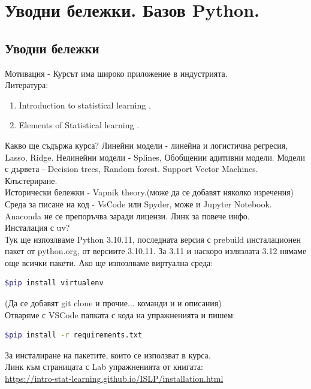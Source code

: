 \section{Уводни бележки. Базов Python.}


\subsection{Уводни бележки}
	Мотивация - Курсът има широко приложение в индустрията.\\	
	Литература:
	\begin{enumerate}
	\item  Introduction to statistical learning \cite{james2023introduction}.
	\item  Elements of Statistical learning  \cite{hastie01statisticallearning}.
	\end{enumerate}
	
	\noindent
	Какво ще съдържа курса? Линейни модели - линейна и логистична регресия, Lasso, Ridge. Нелинейни модели - Splines, Обобщении адитивни модели.
	Модели с дървета - Decision trees, Random forest. Support Vector Machines. Клъстериране.   \\
	
	\noindent
	Исторически бележки - Vapnik theory.(може да се добавят няколко изречения) \\

	\noindent	
	Среда за писане на код - VsCode или Spyder, може и Jupyter Notebook. Anaconda не се препоръчва заради лицензи. Линк за повече инфо. \\
	Инсталация с uv? \\
 	Тук ще изпозлваме Python 3.10.11, последната версия с prebuild инсталационен пакет от python.org,
 	от версиите 3.10.11. За 3.11 и наскоро излязлата 3.12 нямаме още всички пакети. Ако ще изпозлваме виртуална среда: 	
 	\begin{lstlisting}[language=bash]
$pip install virtualenv
 	\end{lstlisting}
 	(Да се добавят git clone и прочие... команди и и описания) \\
 	
 	Отваряме с VSCode папката с кода на упражненията и пишем:
	\begin{lstlisting}[language=bash]
$pip install -r requirements.txt
 	\end{lstlisting}
 	За инсталиране на пакетите, които се използват в курса. \\
 	Линк към страницата с Lab упражненията от книгата:\\
 	\href{https://intro-stat-learning.github.io/ISLP/installation.html}{https://intro-stat-learning.github.io/ISLP/installation.html}
 	
